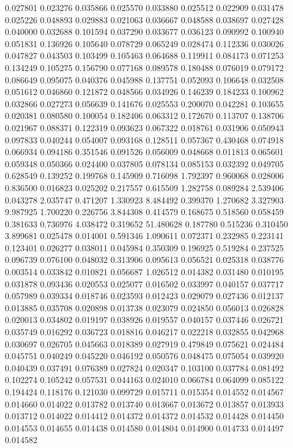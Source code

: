 0.027801
0.023276
0.035866
0.025570
0.033880
0.025512
0.022909
0.031478
0.025226
0.048893
0.029883
0.021063
0.036667
0.048588
0.038697
0.027428
0.040000
0.032688
0.101594
0.037290
0.033677
0.036123
0.090992
0.100940
0.051831
0.136926
0.105640
0.078729
0.065249
0.028474
0.112336
0.030026
0.047827
0.043503
0.103499
0.105463
0.064688
0.119911
0.084173
0.071253
0.134249
0.105275
0.156790
0.077168
0.089578
0.180488
0.076019
0.079172
0.086649
0.095075
0.040376
0.045988
0.137751
0.052093
0.106648
0.032508
0.051612
0.046860
0.121872
0.048566
0.034926
0.146239
0.184233
0.100962
0.032866
0.027273
0.056639
0.141676
0.025553
0.200070
0.042281
0.103655
0.020381
0.080580
0.100054
0.182406
0.063312
0.172670
0.113707
0.138706
0.021967
0.088371
0.122319
0.093623
0.067322
0.018761
0.031906
0.050943
0.097833
0.040244
0.054007
0.093168
0.128511
0.057367
0.430468
0.074918
0.066934
0.094186
0.351546
0.091526
0.056009
0.048668
0.011813
0.065601
0.059348
0.050366
0.024400
0.037805
0.078134
0.085153
0.032392
0.049705
0.628549
0.139252
0.199768
0.145909
0.716098
1.792397
0.960068
0.028006
0.836500
0.016823
0.025202
0.217557
0.615509
1.282758
0.089284
2.539406
0.043278
2.035747
0.471207
1.330923
8.484492
0.399370
1.270682
3.327903
9.987925
1.700220
0.226756
3.844308
0.414579
0.168675
0.518560
0.058459
0.381633
0.736976
4.038472
0.319652
51.480628
0.187780
0.515236
0.310450
3.899681
0.025478
0.014001
0.591346
1.090611
0.072371
0.232985
0.223141
0.123401
0.026277
0.038011
0.045984
0.350309
0.196925
0.519284
0.237525
0.096739
0.076100
0.048032
0.313906
0.095613
0.056521
0.025318
0.038776
0.003514
0.033842
0.010821
0.056687
1.026512
0.014382
0.031480
0.010195
0.031878
0.093436
0.020553
0.025077
0.016502
0.033997
0.040157
0.037717
0.057989
0.039334
0.018746
0.023593
0.012423
0.029079
0.027436
0.012137
0.013885
0.035708
0.020898
0.013738
0.023079
0.024850
0.056013
0.026828
0.020013
0.034802
0.019197
0.038926
0.019557
0.040157
0.037446
0.026721
0.035749
0.016292
0.036723
0.018816
0.046217
0.022218
0.032855
0.042968
0.030697
0.026705
0.045663
0.018389
0.027919
0.479849
0.075621
0.024484
0.045751
0.040249
0.045220
0.046192
0.050576
0.048475
0.075054
0.039920
0.040439
0.037491
0.076389
0.027824
0.020347
0.103100
0.037784
0.081492
0.102274
0.105242
0.057531
0.044163
0.024010
0.066784
0.064099
0.085122
0.194424
0.118176
0.121030
0.099729
0.015711
0.015354
0.014552
0.014567
0.014660
0.014022
0.013782
0.013740
0.013667
0.013672
0.013857
0.013933
0.013712
0.014022
0.014412
0.014372
0.014372
0.014532
0.014428
0.014450
0.014553
0.014655
0.014438
0.014580
0.014804
0.014900
0.014733
0.014497
0.014582
